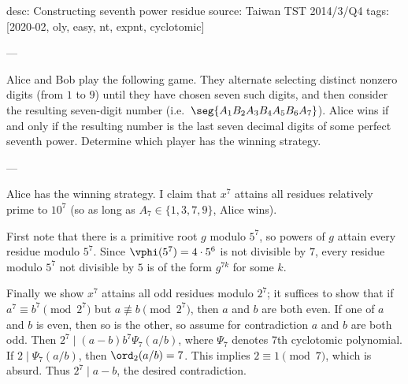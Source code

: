 desc: Constructing seventh power residue
source: Taiwan TST 2014/3/Q4
tags: [2020-02, oly, easy, nt, expnt, cyclotomic]

---

Alice and Bob play the following game. They alternate selecting distinct nonzero digits (from $1$ to $9$) until they have chosen seven such digits, and then consider the resulting seven-digit number (i.e.\ $\seg{A_1B_2A_3B_4A_5B_6A_7}$). Alice wins if and only if the resulting number is the last seven decimal digits of some perfect seventh power. Determine which player has the winning strategy.

---

Alice has the winning strategy. I claim that $x^7$ attains all residues relatively prime to $10^7$ (so as long as $A_7\in\{1,3,7,9\}$, Alice wins).

First note that there is a primitive root $g$ modulo $5^7$, so powers of $g$ attain every residue modulo $5^7$. Since $\vphi(5^7)=4\cdot5^6$ is not divisible by $7$, every residue modulo $5^7$ not divisible by $5$ is of the form $g^{7k}$ for some $k$.

Finally we show $x^7$ attains all odd residues modulo $2^7$; it suffices to show that if $a^7\equiv b^7\pmod{2^7}$ but $a\not\equiv b\pmod{2^7}$, then $a$ and $b$ are both even. If one of $a$ and $b$ is even, then so is the other, so assume for contradiction $a$ and $b$ are both odd. Then $2^7\mid(a-b)b^7\Psi_7(a/b)$, where $\Psi_7$ denotes $7$th cyclotomic polynomial. If $2\mid\Psi_7(a/b)$, then $\ord_2(a/b)=7$. This implies $2\equiv1\pmod7$, which is absurd. Thus $2^7\mid a-b$, the desired contradiction.
